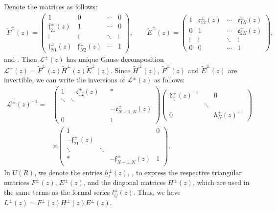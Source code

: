 \documentclass[10pt,a4paper]{amsart}
\numberwithin{equation}{section}
\begin{document}
Denote the matrices as follows:
\begin{align*}\widetilde{F}^{\pm}(z)=\left(
 \begin{matrix}
 1 & 0 & \cdots & 0 \\
 \mathfrak{f}_{21}^{\pm}(z) & 1 & \cdots & 0 \\
 \vdots & \vdots & \ddots & \vdots \\
 \mathfrak{f}_{N1}^{\pm}(z) & \mathfrak{f}_{N2}^{\pm}(z) & \cdots & 1
 \end{matrix}\right),\qquad
 \widetilde{E}^{\pm}(z)=\left(\begin{matrix}
 1 & \mathfrak{e}_{12}^{\pm}(z) & \cdots & \mathfrak{e}_{1N}^{\pm}(z) \\
 0 & 1 & \cdots & \mathfrak{e}_{2N}^{\pm}(z) \\
 \vdots & \vdots & \ddots & \vdots \\
 0& 0 & \cdots & 1
 \end{matrix}\right),
\end{align*}
and .
Then
$\mathcal{L}^{\pm}(z)$ has unique Gauss decomposition
$\mathcal{L}^{\pm}(z)=\widetilde{F}^{\pm}(z)\widetilde{H}^{\pm}(z)\widetilde{E}^{\pm}(z)$.
Since $\widetilde{H}^{\pm}(z)$, $\widetilde{F}^{\pm}(z)$ and $\widetilde{E}^{\pm}(z)$ are invertible, we can
write the inversions of $\mathcal{L}^{\pm}(z)$ as follows:
\begin{align*}
 \mathcal{L}^{\pm}(z)^{-1}={}&\left(
 \begin{matrix}
 1 & -\mathfrak{e}_{12}^{\pm}(z) & &* \\
 \ddots & \ddots& &\\
 & & & -\mathfrak{e}_{N-1,N}^{\pm}(z)\\
 0 & & &1
 \end{matrix}
 \right)\left(
 \begin{matrix}
 \mathfrak{h}_1^{\pm}(z)^{-1} & & 0 \\
 & \ddots & \\
 0 & & h_N^{\pm}(z)^{-1}
 \end{matrix}
 \right) \nonumber\\
 & \times\left(
 \begin{matrix}
 1 & & & 0 \\
 -\mathfrak{f}_{21}^{\pm}(z) & & & \\
 \ddots & \ddots & & \\
 *& & -\mathfrak{f}_{N-1,N}^{\pm}(z) & 1
 \end{matrix}
 \right).
\end{align*}
In $U(R)$, we denote the entries $h_i^{\pm}(z)$, ,  to express the respective triangular matrices $F^{\pm}(z)$, $E^{\pm}(z)$, and the diagonal matrices $H^{\pm}(z)$, which are used in the same terms as the formal series $l_{ij}^{\pm}(z)$. Thus, we have
$
 L^{\pm}(z)=F^{\pm}(z)H^{\pm}(z)E^{\pm}(z)$.
\end{document}
